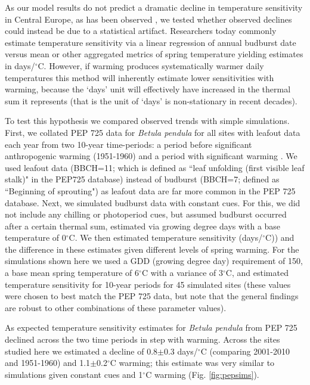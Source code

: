 \documentclass{article}
\begin{document}
As our model results do not predict a dramatic decline in temperature sensitivity in Central Europe, as has been observed \citep[e.g.,][]{fu2015}, we tested whether observed declines could instead be due to a statistical artifact. Researchers today commonly estimate temperature sensitivity via a linear regression of annual budburst date versus mean or other aggregated metrics of spring temperature yielding estimates in days/$^{\circ}$C. However, if warming produces systematically warmer daily temperatures this method will inherently estimate lower sensitivities with warming, because the `days' unit will effectively have increased in the thermal sum it represents (that is the unit of `days' is non-stationary in recent decades).
\par To test this hypothesis we compared observed trends with simple simulations. First, we collated PEP 725 data \citep{Templ2018} for \emph{Betula pendula} for all sites with leafout data each year from two 10-year time-periods: a period before significant anthropogenic warming (1951-1960) and a period with significant warming \citep[2001-2010, see][]{IPCC:2014sm}. We used leafout data (BBCH=11; which is defined as ``leaf unfolding (first visible leaf stalk)" in the PEP725 database) instead of budburst (BBCH=7; defined as ``Beginning of sprouting") as leafout data are far more common in the PEP 725 database. Next, we simulated budburst data with constant cues. For this, we did not include any chilling or photoperiod cues, but assumed budburst occurred after a certain thermal sum, estimated via growing degree days with a base temperature of 0$^{\circ}$C. We then estimated temperature sensitivity (days/$^{\circ}$C)) and the difference in these estimates given different levels of spring warming. For the simulations shown here we used a GDD (growing degree day) requirement of 150, a base mean spring temperature of 6$^{\circ}$C with a variance of 3$^{\circ}$C, and estimated temperature sensitivity for 10-year periods for 45 simulated sites (these values were chosen to best match the PEP 725 data, but note that the general findings are robust to other combinations of these parameter values).

\par As expected temperature sensitivity estimates for \emph{Betula pendula} from PEP 725 declined across the two time periods in step with warming. Across the sites studied here we estimated a decline of 0.8$\pm$0.3 days/$^{\circ}$C (comparing 2001-2010 and 1951-1960) and 1.1$\pm$0.2$^{\circ}$C warming; this estimate was very similar to simulations given constant cues and 1$^{\circ}$C warming (Fig. \ref{fig:pepsims}). 
\end{document}
